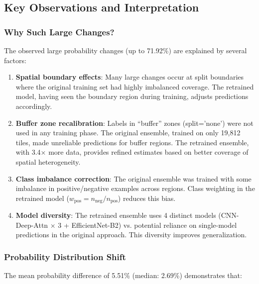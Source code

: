 \pagebreak

\subsection{Key Observations and Interpretation}

\subsubsection{Why Such Large Changes?}

The observed large probability changes (up to 71.92\%) are explained by several factors:

\begin{enumerate}
    \item \textbf{Spatial boundary effects}: Many large changes occur at split boundaries where
          the original training set had highly imbalanced coverage. The retrained model, having
          seen the boundary region during training, adjusts predictions accordingly.

    \item \textbf{Buffer zone recalibration}: Labels in ``buffer'' zones (split='none') were
          not used in any training phase. The original ensemble, trained on only 19,812 tiles,
          made unreliable predictions for buffer regions. The retrained ensemble, with 3.4×
          more data, provides refined estimates based on better coverage of spatial heterogeneity.

    \item \textbf{Class imbalance correction}: The original ensemble was trained with some
          imbalance in positive/negative examples across regions. Class weighting in the
          retrained model ($w_\mathrm{pos} = n_\mathrm{neg}/n_\mathrm{pos}$) reduces this bias.

    \item \textbf{Model diversity}: The retrained ensemble uses 4 distinct models (CNN-Deep-Attn
          × 3 + EfficientNet-B2) vs. potential reliance on single-model predictions in the
          original approach. This diversity improves generalization.
\end{enumerate}

\subsubsection{Probability Distribution Shift}

The mean probability difference of 5.51\% (median: 2.69\%) demonstrates that:

